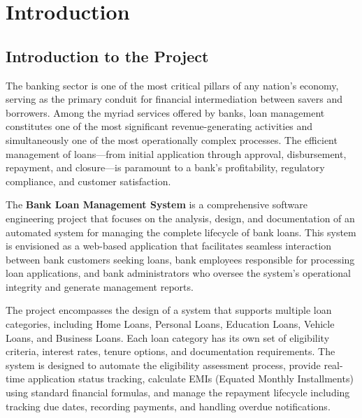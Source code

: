 \documentclass[12pt,a4paper,oneside]{report}
\begin{document}
\newpage
\tableofcontents
\newpage
\listoffigures
\newpage
\listoftables

\newpage
{}
\setcounter{page}{1}

\chapter{Introduction}

\section{Introduction to the Project}

The banking sector is one of the most critical pillars of any nation's economy, serving as the primary conduit for financial intermediation between savers and borrowers. Among the myriad services offered by banks, loan management constitutes one of the most significant revenue-generating activities and simultaneously one of the most operationally complex processes. The efficient management of loans—from initial application through approval, disbursement, repayment, and closure—is paramount to a bank's profitability, regulatory compliance, and customer satisfaction.

The \textbf{Bank Loan Management System} is a comprehensive software engineering project that focuses on the analysis, design, and documentation of an automated system for managing the complete lifecycle of bank loans. This system is envisioned as a web-based application that facilitates seamless interaction between bank customers seeking loans, bank employees responsible for processing loan applications, and bank administrators who oversee the system's operational integrity and generate management reports.

The project encompasses the design of a system that supports multiple loan categories, including Home Loans, Personal Loans, Education Loans, Vehicle Loans, and Business Loans. Each loan category has its own set of eligibility criteria, interest rates, tenure options, and documentation requirements. The system is designed to automate the eligibility assessment process, provide real-time application status tracking, calculate EMIs (Equated Monthly Installments) using standard financial formulas, and manage the repayment lifecycle including tracking due dates, recording payments, and handling overdue notifications.
\end{document}
